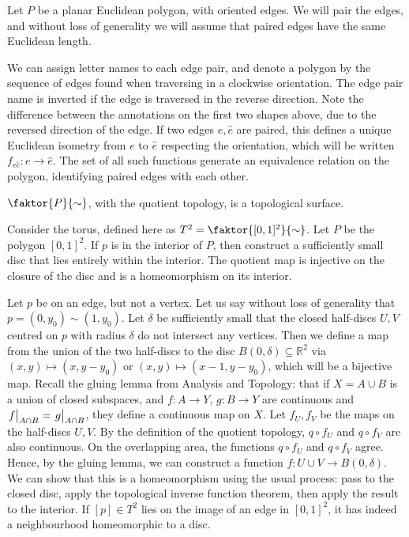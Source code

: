 \begin{example}
	Let \( P \) be a planar Euclidean polygon, with oriented edges.
	We will pair the edges, and without loss of generality we will assume that paired edges have the same Euclidean length.
	\begin{center}
		\quad
		\quad
	\end{center}
	We can assign letter names to each edge pair, and denote a polygon by the sequence of edges found when traversing in a clockwise orientation.
	The edge pair name is inverted if the edge is traversed in the reverse direction.
	Note the difference between the annotations on the first two shapes above, due to the reversed direction of the edge.
	If two edges \( e, \hat e \) are paired, this defines a unique Euclidean isometry from \( e \) to \( \hat e \) respecting the orientation, which will be written \( f_{e\hat e} \colon e \to \hat e \).
	The set of all such functions generate an equivalence relation on the polygon, identifying paired edges with each other.
	\begin{lemma}
		\( \faktor{P}{\sim} \), with the quotient topology, is a topological surface.
	\end{lemma}
	\begin{example}
		Consider the torus, defined here as \( T^2 = \faktor{[0,1]^2}{\sim} \).
		Let \( P \) be the polygon \( [0,1]^2 \).
		If \( p \) is in the interior of \( P \), then construct a sufficiently small disc that lies entirely within the interior.
		The quotient map is injective on the closure of the disc and is a homeomorphism on its interior.

		Let \( p \) be on an edge, but not a vertex.
		Let us say without loss of generality that \( p = (0,y_0) \sim (1,y_0) \).
		Let \( \delta \) be sufficiently small that the closed half-discs \( U, V \) centred on \( p \) with radius \( \delta \) do not intersect any vertices.
		Then we define a map from the union of the two half-discs to the disc \( B(0,\delta) \subseteq \mathbb R^2 \) via \( (x,y) \mapsto (x,y-y_0) \) or \( (x,y) \mapsto (x-1,y-y_0) \), which will be a bijective map.
		Recall the gluing lemma from Analysis and Topology: that if \( X = A \cup B \) is a union of closed subspaces, and \( f \colon A \to Y \), \( g \colon B \to Y \) are continuous and \( \eval{f}_{A \cap B} = \eval{g}_{A \cap B} \), they define a continuous map on \( X \).
		Let \( f_U, f_V \) be the maps on the half-discs \( U, V \).
		By the definition of the quotient topology, \( q \circ f_U \) and \( q \circ f_V \) are also continuous.
		On the overlapping area, the functions \( q \circ f_U \) and \( q \circ f_V \) agree.
		Hence, by the gluing lemma, we can construct a function \( f \colon U \cup V \to B(0, \delta) \).
		We can show that this is a homeomorphism using the usual process: pass to the closed disc, apply the topological inverse function theorem, then apply the result to the interior.
		If \( [p] \in T^2 \) lies on the image of an edge in \( [0,1]^2 \), it has indeed a neighbourhood homeomorphic to a disc.


\end{example}
\end{example}
